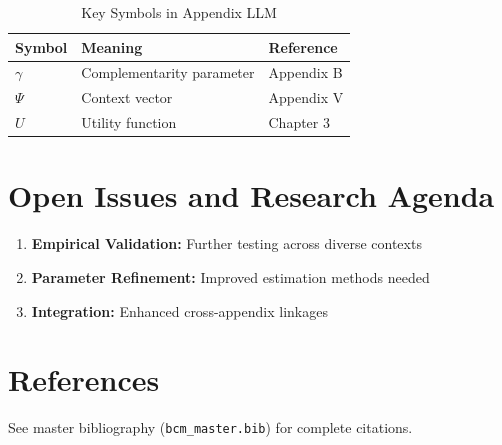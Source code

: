 \begin{table}[htbp]
\centering
\caption{Key Symbols in Appendix LLM}
\begin{tabular}{lll}
\toprule
\textbf{Symbol} & \textbf{Meaning} & \textbf{Reference} \\
\midrule
$\gamma$ & Complementarity parameter & Appendix B \\
$\Psi$ & Context vector & Appendix V \\
$U$ & Utility function & Chapter 3 \\
\bottomrule
\end{tabular}
\end{table}



\section{Open Issues and Research Agenda}
\label{sec:llm-open}

\begin{enumerate}
    \item \textbf{Empirical Validation:} Further testing across diverse contexts
    \item \textbf{Parameter Refinement:} Improved estimation methods needed
    \item \textbf{Integration:} Enhanced cross-appendix linkages
\end{enumerate}

\section{References}
\label{sec:llm-references}

See master bibliography (\texttt{bcm\_master.bib}) for complete citations.

\nocite{bcm_master}

